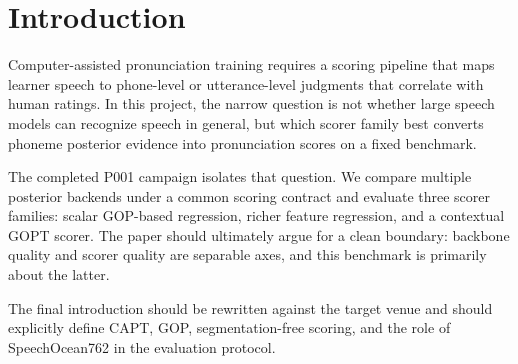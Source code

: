 \section{Introduction}

Computer-assisted pronunciation training requires a scoring pipeline that maps
learner speech to phone-level or utterance-level judgments that correlate with
human ratings. In this project, the narrow question is not whether large speech
models can recognize speech in general, but which scorer family best converts
phoneme posterior evidence into pronunciation scores on a fixed benchmark.

The completed P001 campaign isolates that question. We compare multiple
posterior backends under a common scoring contract and evaluate three scorer
families: scalar GOP-based regression, richer feature regression, and a
contextual GOPT scorer. The paper should ultimately argue for a clean boundary:
backbone quality and scorer quality are separable axes, and this benchmark is
primarily about the latter.

The final introduction should be rewritten against the target venue and should
explicitly define CAPT, GOP, segmentation-free scoring, and the role of
SpeechOcean762 in the evaluation protocol.
